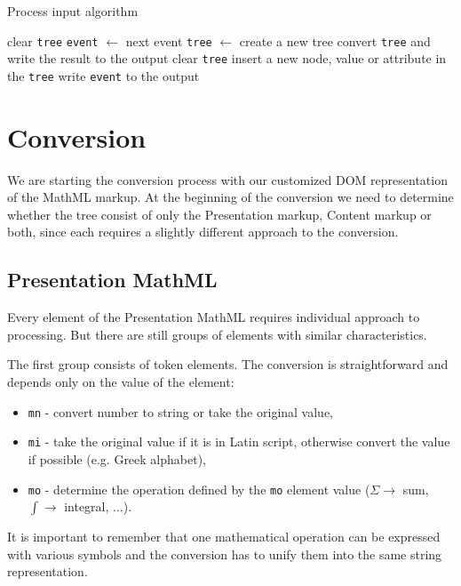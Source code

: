 \documentclass[11pt,oneside,final]{fithesis2}
\begin{document}
\begin{algorithm}[!ht]
\caption{Process input algorithm}
\label{alg-processinput}
\begin{algorithmic}[1]
	\State clear \texttt{tree}
		\State \texttt{event} $\gets$ next event
			\State \texttt{tree} $\gets$ create a new tree
			\State convert \texttt{tree} and write the result to the output
			\State clear \texttt{tree}			
			\State insert a new node, value or attribute in the \texttt{tree}
		\Else
			\State write \texttt{event} to the output
		\EndIf
	\EndWhile
\EndProcedure
\end{algorithmic}
\end{algorithm}

\section{Conversion}
We are starting the conversion process with our customized DOM representation of the MathML markup. At the beginning of the conversion we need to determine whether the tree consist of only the Presentation markup, Content markup or both, since each requires a slightly different approach to the conversion. 

\subsection{Presentation MathML}
Every element of the Presentation MathML requires individual approach to processing. But there are still groups of elements with similar characteristics. 

The first group consists of token elements. The conversion is straightforward and depends only on the value of the element:
\begin{itemize}
\item \texttt{mn} - convert number to string or take the original value,
\item \texttt{mi} - take the original value if it is in Latin script, otherwise convert the value if possible (e.g. Greek alphabet),
\item \texttt{mo} - determine the operation defined by the \texttt{mo} element value ($\Sigma \rightarrow$ sum, $\int \rightarrow$ integral, $\ldots$).
\end{itemize}
It is important to remember that one mathematical operation can be expressed with various symbols and the conversion has to unify them into the same string representation.
\end{document}
